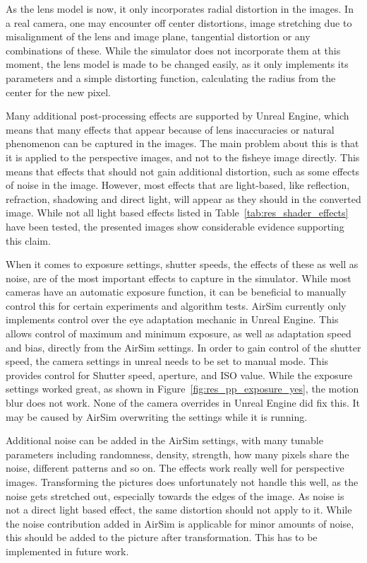 As the lens model is now, it only incorporates radial distortion in the images. In a real camera, one may encounter off center distortions, image stretching due to misalignment of the lens and image plane, tangential distortion or any combinations of these. While the simulator does not incorporate them at this moment, the lens model is made to be changed easily, as it only implements its parameters and a simple distorting function, calculating the radius from the center for the new pixel.

Many additional post-processing effects are supported by Unreal Engine, which means that many effects that appear because of lens inaccuracies or natural phenomenon can be captured in the images. The main problem about this is that it is applied to the perspective images, and not to the fisheye image directly. This means that effects that should not gain additional distortion, such as some effects of noise in the image. However, most effects that are light-based, like reflection, refraction, shadowing and direct light, will appear as they should in the converted image. While not all light based effects listed in Table~\ref{tab:res_shader_effects} have been tested, the presented images show considerable evidence supporting this claim.

When it comes to exposure settings, shutter speeds, the effects of these as well as noise, are of the most important effects to capture in the simulator. While most cameras have an automatic exposure function, it can be beneficial to manually control this for certain experiments and algorithm tests. AirSim currently only implements control over the eye adaptation mechanic in Unreal Engine. This allows control of maximum and minimum exposure, as well as adaptation speed and bias, directly from the AirSim settings. In order to gain control of the shutter speed, the camera settings in unreal needs to be set to manual mode. This provides control for Shutter speed, aperture, and ISO value. While the exposure settings worked great, as shown in Figure~\ref{fig:res_pp_exposure_yes}, the motion blur does not work. None of the camera overrides in Unreal Engine did fix this. It may be caused by AirSim overwriting the settings while it is running.

Additional noise can be added in the AirSim settings, with many tunable parameters including randomness, density, strength, how many pixels share the noise, different patterns and so on. The effects work really well for perspective images. Transforming the pictures does unfortunately not handle this well, as the noise gets stretched out, especially towards the edges of the image. As noise is not a direct light based effect, the same distortion should not apply to it. While the noise contribution added in AirSim is applicable for minor amounts of noise, this should be added to the picture after transformation. This has to be implemented in future work.

